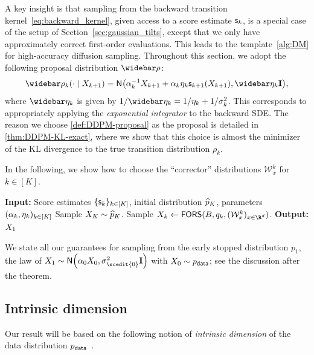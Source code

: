 

A key insight is that sampling from the backward transition kernel~\eqref{eq:backward_kernel}, given access to a score estimate $\mathsf{s}_k$, is a special case of the setup of Section~\ref{sec:gaussian_tilts}, except that we only have approximately correct first-order evaluations.
This leads to the template~\cref{alg:DM} for high-accuracy diffusion sampling. Throughout this section, we adopt the following proposal distribution $\rhobar$:
\begin{align}\label{def:DDPM-proposal}
    \rhobar_k(\cdot\mid{}\xr{k+1})=\normal{ \alp_k^{-1} \xr{k+1} + \alpha_k \eta_k \scf_{k+1}(\xr{k+1}), \etabar_k \Id },
\end{align}
where $\etabar_k$ is given by $1/\etabar_k=1/\eta_k+1/\sigma_k^2$. This corresponds to appropriately applying the \emph{exponential integrator} to the backward SDE. The reason we choose \cref{def:DDPM-proposal} as the proposal is detailed in \cref{thm:DDPM-KL-exact}, where we show that this choice is almost the minimizer of the KL divergence to the true transition distribution $\rho_k$.


In the following, we show how to choose the ``corrector'' distributions $\mathcal W_x^k$ for $k\in [K]$.




\begin{algorithm}[H]
  \caption{Backward diffusion sampling}\label{alg:DM}
\begin{algorithmic}
\STATE \textbf{Input:} Score estimates $\{\mathsf{s}_k\}_{k\in [K]}$, initial distribution $\widehat{p}_K$, parameters $(\alpha_k,\eta_k)_{k\in [K]}$
\STATE Sample $X_{K}\sim \widehat{p}_K$.
\STATE Sample $\xr{k}\leftarrow \AlgWSC(B, q_k, (\mathcal W^k_x)_{x\in\R^d})$.
\ENDFOR
\STATE \textbf{Output:} $X_{1}$
\end{algorithmic}
\end{algorithm}

We state all our guarantees for sampling from the early stopped distribution $p_1$, the law of $X_1 \sim \normal{\alpha_0 X_0, \sigma_{\scedit{0}}^2 \Id}$ with $X_0 \sim p_{\mathsf{data}}$; see the discussion after the theorem. 

\subsection{Intrinsic dimension}\label{ssec:intrinsic}

Our result will be based on the following notion of \emph{intrinsic dimension} of the data distribution $p_{\mathsf{data}}$~\citep{li2024adapting}.

